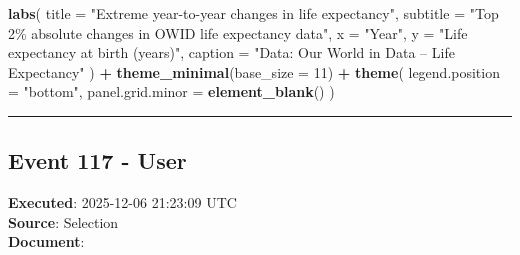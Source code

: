 \documentclass[
  11pt,
]{article}
\newenvironment{Shaded}{\begin{snugshade}}{\end{snugshade}}
\newcommand{\AttributeTok}[1]{\textcolor[rgb]{0.13,0.29,0.53}{#1}}
\newcommand{\DecValTok}[1]{\textcolor[rgb]{0.00,0.00,0.81}{#1}}
\newcommand{\FunctionTok}[1]{\textcolor[rgb]{0.13,0.29,0.53}{\textbf{#1}}}
\newcommand{\NormalTok}[1]{#1}
\newcommand{\SpecialCharTok}[1]{\textcolor[rgb]{0.81,0.36,0.00}{\textbf{#1}}}
\newcommand{\StringTok}[1]{\textcolor[rgb]{0.31,0.60,0.02}{#1}}
\begin{document}
\begin{Shaded}
\begin{Highlighting}[]
  \FunctionTok{labs}\NormalTok{(}
    \AttributeTok{title =} \StringTok{"Extreme year{-}to{-}year changes in life expectancy"}\NormalTok{,}
    \AttributeTok{subtitle =} \StringTok{"Top 2\% absolute changes in OWID life expectancy data"}\NormalTok{,}
    \AttributeTok{x =} \StringTok{"Year"}\NormalTok{,}
    \AttributeTok{y =} \StringTok{"Life expectancy at birth (years)"}\NormalTok{,}
    \AttributeTok{caption =} \StringTok{"Data: Our World in Data – Life Expectancy"}
\NormalTok{  ) }\SpecialCharTok{+}
  \FunctionTok{theme\_minimal}\NormalTok{(}\AttributeTok{base\_size =} \DecValTok{11}\NormalTok{) }\SpecialCharTok{+}
  \FunctionTok{theme}\NormalTok{(}
    \AttributeTok{legend.position =} \StringTok{"bottom"}\NormalTok{,}
    \AttributeTok{panel.grid.minor =} \FunctionTok{element\_blank}\NormalTok{()}
\NormalTok{  )}
\end{Highlighting}
\end{Shaded}

\begin{center}\rule{0.5\linewidth}{0.5pt}\end{center}

\subsection{Event 117 - User}\label{event-117---user}

\textbf{Executed}: 2025-12-06 21:23:09 UTC\\
\textbf{Source}: Selection\\
\textbf{Document}:
\end{document}
